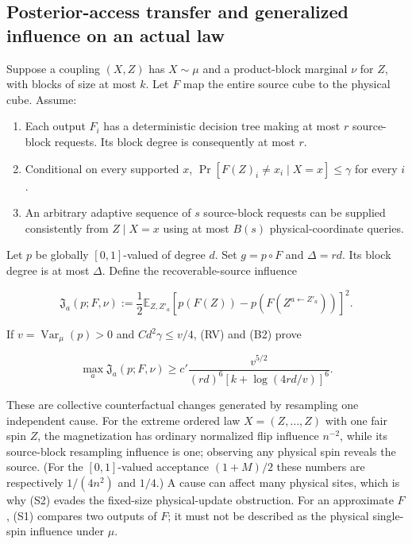\subsection{Posterior-access transfer and generalized influence on an
actual
law}\label{influence-recovery:posterior-access-transfer-and-generalized-influence-on-an-actual-law}

Suppose a coupling \((X,Z)\) has \(X\sim\mu\) and a product-block
marginal \(\nu\) for \(Z\), with blocks of size at most \(k\). Let \(F\)
map the entire source cube to the physical cube. Assume:

\begin{enumerate}
\def\labelenumi{\arabic{enumi}.}
\tightlist
\item
  Each output \(F_i\) has a deterministic decision tree making at most
  \(r\) source-block requests. Its block degree is consequently at most
  \(r\).
\item
  Conditional on every supported \(x\),
  \(\Pr[F(Z)_i\ne x_i\mid X=x]\le\gamma\) for every \(i\).
\item
  An arbitrary adaptive sequence of \(s\) source-block requests can be
  supplied consistently from \(Z\mid X=x\) using at most \(B(s)\)
  physical-coordinate queries.
\end{enumerate}

Let \(p\) be globally \([0,1]\)-valued of degree \(d\). Set
\(g=p\circ F\) and \(\Delta=rd\). Its block degree is at most
\(\Delta\). Define the recoverable-source influence

\[
 \mathfrak J_a(p;F,\nu)
 :=\frac12\mathbb E_{Z,Z'_a}
       [p(F(Z))-p(F(Z^{a\leftarrow Z'_a}))]^2.
 \tag{S1}
\]

If \(v=\operatorname{Var}_\mu(p)>0\) and \(Cd^2\gamma\le v/4\), (RV) and
(B2) prove

\[
 \boxed{\quad
 \max_a\mathfrak J_a(p;F,\nu)
 \ge c'\frac{v^{5/2}}
 {(rd)^6[k+\log(4rd/v)]^6}.
 \quad} \tag{S2}
\]

These are collective counterfactual changes generated by resampling one
independent cause. For the extreme ordered law \(X=(Z,\ldots,Z)\) with
one fair spin \(Z\), the magnetization has ordinary normalized flip
influence \(n^{-2}\), while its source-block resampling influence is
one; observing any physical spin reveals the source. (For the
\([0,1]\)-valued acceptance \((1+M)/2\) these numbers are respectively
\(1/(4n^2)\) and \(1/4\).) A cause can affect many physical sites, which
is why (S2) evades the fixed-size physical-update obstruction. For an
approximate \(F\), (S1) compares two outputs of \(F\); it must not be
described as the physical single-spin influence under \(\mu\).


